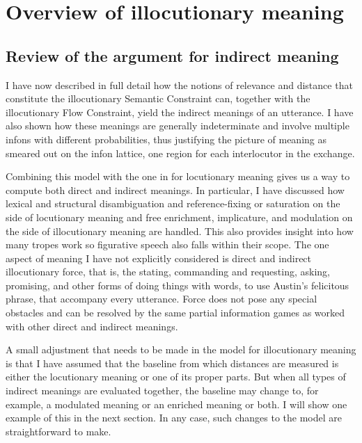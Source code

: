 \chapter{Overview of illocutionary meaning}
\section{Review of the argument for indirect meaning} \label{sec:review}

I have now described in full detail how the notions of relevance and distance that constitute the illocutionary Semantic Constraint can, together with the illocutionary Flow Constraint, yield the indirect meanings of an utterance. I have also shown how these meanings are generally indeterminate and involve multiple infons with different probabilities, thus justifying the picture of meaning as smeared out on the infon lattice, one region for each interlocutor in the exchange.

Combining this model with the one in  for locutionary meaning gives us a way to compute both direct and indirect meanings. In particular, I have discussed how lexical and structural disambiguation and reference-fixing or saturation on the side of locutionary meaning and free enrichment, implicature, and modulation on the side of illocutionary meaning are handled. This also provides insight into how many tropes work so figurative speech also falls within their scope. The one aspect of meaning I have not explicitly considered is direct and indirect illocutionary force, that is, the stating, commanding and requesting, asking, promising, and other forms of doing things with words, to use Austin's felicitous phrase, that accompany every utterance. Force does not pose any special obstacles and can be resolved by the same partial information games as worked with other direct and indirect meanings.

A small adjustment that needs to be made in the model for illocutionary meaning is that I have assumed that the baseline from which distances are measured is either the locutionary meaning or one of its proper parts. But when all types of indirect meanings are evaluated together, the baseline may change to, for example, a modulated meaning or an enriched meaning or both. I will show one example of this in the next section. In any case, such changes to the model are straightforward to make.

